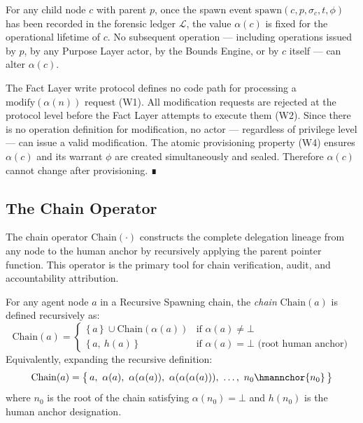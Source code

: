 \begin{prop}
\label{prop:parent-pointer-immutable}
For any child node $c$ with parent $p$, once the spawn event $\mathrm{spawn}(c, p, \sigma_c, t, \phi)$ has been recorded in the forensic ledger $\mathcal{L}$, the value $\alpha(c)$ is fixed for the operational lifetime of $c$. No subsequent operation --- including operations issued by $p$, by any Purpose Layer actor, by the Bounds Engine, or by $c$ itself --- can alter $\alpha(c)$.
\end{prop}

\begin{pf}
The Fact Layer write protocol defines no code path for processing a $\mathrm{modify}(\alpha(n))$ request (W1). All modification requests are rejected at the protocol level before the Fact Layer attempts to execute them (W2). Since there is no operation definition for modification, no actor --- regardless of privilege level --- can issue a valid modification. The atomic provisioning property (W4) ensures $\alpha(c)$ and its warrant $\phi$ are created simultaneously and sealed. Therefore $\alpha(c)$ cannot change after provisioning. ∎
\end{pf}

\subsection{The Chain Operator}
\label{sec:chain-operator}

The chain operator $\mathrm{Chain}(\cdot)$ constructs the complete delegation lineage from any node to the human anchor by recursively applying the parent pointer function. This operator is the primary tool for chain verification, audit, and accountability attribution.

\begin{dfn}
\label{def:chain-operator}
For any agent node $a$ in a Recursive Spawning chain, the \emph{chain} $\mathrm{Chain}(a)$ is defined recursively as:
\begin{equation}
\mathrm{Chain}(a) =
\begin{cases}
\{\,a\,\}\ \cup \mathrm{Chain}(\alpha(a)) & \text{if } \alpha(a) \neq \bot \\[6pt]
\{\,a,\ h(a)\,\} & \text{if } \alpha(a) = \bot \text{ (root human anchor)}
\end{cases}
\label{eq:chain-operator}
\end{equation}
Equivalently, expanding the recursive definition:
\begin{equation}
\mathrm{Chain}(a) = \bigl\{\, a,\ \alpha(a),\ \alpha(\alpha(a)),\ \alpha(\alpha(\alpha(a))),\ \ldots,\ n_0 \hmannchor{n_0} \,\bigr\}
\label{eq:chain-expanded}
\end{equation}
where $n_0$ is the root of the chain satisfying $\alpha(n_0) = \bot$ and $h(n_0)$ is the human anchor designation.
\end{dfn}

